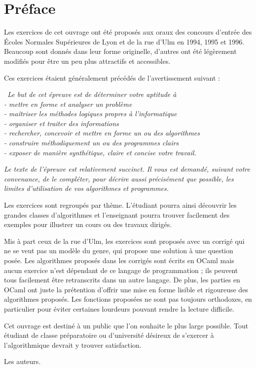 \chapter{Préface}

Les exercices de cet ouvrage ont été proposés aux oraux des concours d'entrée des Écoles Normales Supérieures de Lyon et de la rue d'Ulm en 1994, 1995 et 1996. Beaucoup sont donnés dans leur forme originelle, d'autres ont été légèrement modifiés pour être un peu plus attractifs et accessibles.
\medskip

Ces exercices étaient généralement précédés de l'avertissement suivant :
\medskip

\textit{\og \ Le but de cet épreuve est de déterminer votre aptitude à\\
    - mettre en forme et analyser un problème\\
    - maîtriser les méthodes logiques propres à l'informatique\\
    - organiser et traiter des informations\\
    - rechercher, concevoir et mettre en forme un ou des algorithmes\\
    - construire méthodiquement un ou des programmes clairs\\
    - exposer de manière synthétique, claire et concise votre travail.}

\medskip
\textit{Le texte de l'épreuve est relativement succinct. Il vous est demandé, suivant votre convenance, de le compléter, pour décrire aussi précisément que possible, les limites d'utilisation de vos algorithmes et programmes. \fg{}}
\medskip

Les exercices sont regroupés par thème. L'étudiant pourra ainsi découvrir les grandes classes d'algorithmes et l'enseignant pourra trouver facilement des exemples pour illustrer un cours ou des travaux dirigés.
\medskip

Mis à part ceux de la rue d'Ulm, les exercices sont proposés avec un corrigé qui ne se veut pas un modèle du genre, qui propose une solution à une question posée. Les algorithmes proposés dans les corrigés sont écrits en OCaml mais aucun exercice n'est dépendant de ce langage de programmation ; ils peuvent tous facilement être retranscrits dans un autre langage. De plus, les parties en OCaml ont juste la prétention d'offrir une mise en forme lisible et rigoureuse des algorithmes proposés. Les fonctions proposées ne sont pas toujours orthodoxes, en particulier pour éviter certaines lourdeurs pouvant rendre la lecture difficile.
\newpage

Cet ouvrage est destiné à un public que l'on souhaite le plus large possible. Tout étudiant de classe préparatoire ou d'université désireux de s'exercer à l'algorithmique devrait y trouver satisfaction.
\medskip

Les auteurs.
\bigskip

\Fin
